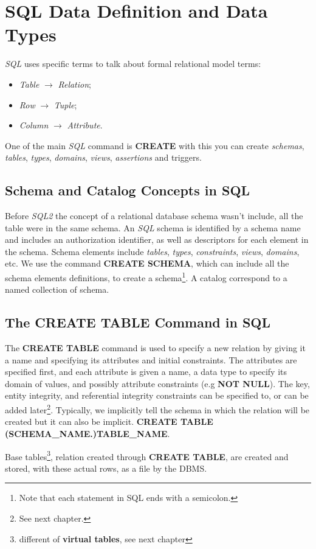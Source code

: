\section{SQL Data Definition and Data Types}
\textit{SQL} uses specific terms to talk about formal relational model terms:
\begin{itemize}
    \item \textit{Table} $\rightarrow$ \textit{Relation};
    \item \textit{Row} $\rightarrow$ \textit{Tuple};
    \item \textit{Column} $\rightarrow$ \textit{Attribute}.
\end{itemize}
One of the main \textit{SQL} command is \textbf{CREATE} with this you can create \textit{schemas}, \textit{tables}, \textit{types}, \textit{domains}, \textit{views}, \textit{assertions} and triggers.
\subsection{Schema and Catalog Concepts in SQL}
Before \textit{SQL2} the concept of a relational database schema wasn't include, all the table were in the same schema.
An \textit{SQL} schema is identified by a schema name and includes an authorization identifier, as well as descriptors for each element in the schema. Schema elements include \textit{tables}, \textit{types}, \textit{constraints}, \textit{views}, \textit{domains}, etc.
We use the command \textbf{CREATE SCHEMA}, which can include all the schema elements definitions, to create a schema\footnote{Note that each statement in SQL ends with a semicolon.}. A catalog correspond to a named collection of schema.
\subsection{The CREATE TABLE Command in SQL}
The \textbf{CREATE TABLE} command is used to specify a new relation by giving it a name and specifying its attributes and initial constraints. The attributes are specified first, and each attribute is given a name, a data type to specify its domain of values, and possibly attribute constraints (e.g \textbf{NOT NULL}). The key, entity integrity, and referential integrity constraints can be specified to, or can be added later\footnote{See next chapter.}. Typically, we implicitly tell the schema in which the relation will be created but it can also be implicit. \textbf{CREATE TABLE (SCHEMA\_NAME.)TABLE\_NAME}.

Base tables\footnote{different of \textbf{virtual tables}, see next chapter}, relation created through \textbf{CREATE TABLE}, are created and stored, with these actual rows, as a file by the DBMS.

